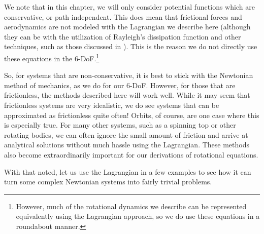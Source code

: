 \documentclass[12pt]{report}
\begin{document}
We note that in this chapter, we will only consider potential functions which are \gls{conservative}, or path independent. This does mean that frictional forces and aerodynamics are not modeled with the \gls{Lagrangian} we describe here (although they can be with the utilization of Rayleigh's dissipation function and other techniques, such as those discussed in \cite{rabei_hamiltonian_2004}). This is the reason we do not directly use these equations in the 6-DoF.\footnote{However, much of the rotational dynamics we describe can be represented equivalently using the \gls{Lagrangian} approach, so we do use these equations in a roundabout manner.}

So, for systems that are non-conservative, it is best to stick with the Newtonian method of mechanics, as we do for our 6-DoF. However, for those that are frictionless, the methods described here will work well. While it may seem that frictionless systems are very idealistic, we do see systems that can be approximated as frictionless quite often! Orbits, of course, are one case where this is especially true. For many other systems, such as a spinning top or other rotating bodies, we can often ignore the small amount of friction and arrive at analytical solutions without much hassle using the \gls{Lagrangian}. These methods also become extraordinarily important for our derivations of rotational equations.

With that noted, let us use the \gls{Lagrangian} in a few examples to see how it can turn some complex Newtonian systems into fairly trivial problems.
\end{document}

